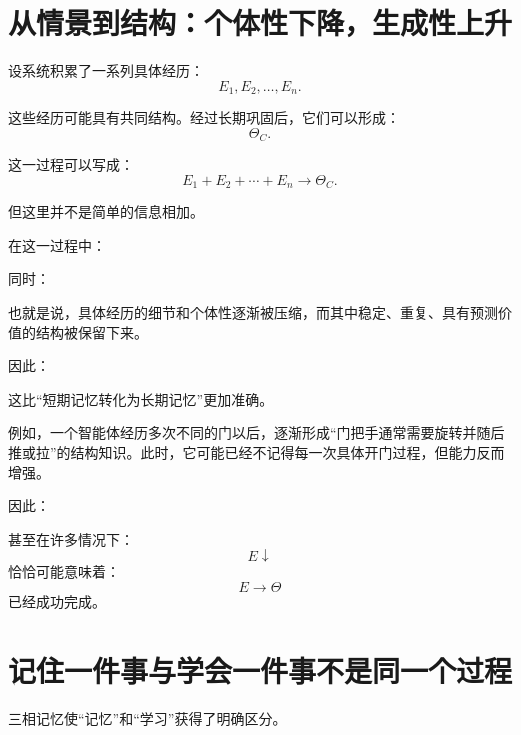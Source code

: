 \section{从情景到结构：个体性下降，生成性上升}

设系统积累了一系列具体经历：
\[
E_1,E_2,\ldots,E_n.
\]

这些经历可能具有共同结构。经过长期巩固后，它们可以形成：
\[
\Theta_C.
\]

这一过程可以写成：
\[
\boxed{
E_1+E_2+\cdots+E_n
\rightarrow
\Theta_C.
}
\]

但这里并不是简单的信息相加。

在这一过程中：
\begin{statementbox}
\centering
{}
\end{statementbox}
同时：
\begin{statementbox}
\centering
{}
\end{statementbox}

也就是说，具体经历的细节和个体性逐渐被压缩，而其中稳定、重复、具有预测价值的结构被保留下来。

因此：
\begin{statementbox}
\centering
{}
\end{statementbox}

这比“短期记忆转化为长期记忆”更加准确。

例如，一个智能体经历多次不同的门以后，逐渐形成“门把手通常需要旋转并随后推或拉”的结构知识。此时，它可能已经不记得每一次具体开门过程，但能力反而增强。

因此：
\begin{statementbox}
\centering
{}
\end{statementbox}

甚至在许多情况下：
\[
\boxed{
E\downarrow
}
\]
恰恰可能意味着：
\[
\boxed{
E\rightarrow\Theta
}
\]
已经成功完成。

\section{记住一件事与学会一件事不是同一个过程}

三相记忆使“记忆”和“学习”获得了明确区分。

